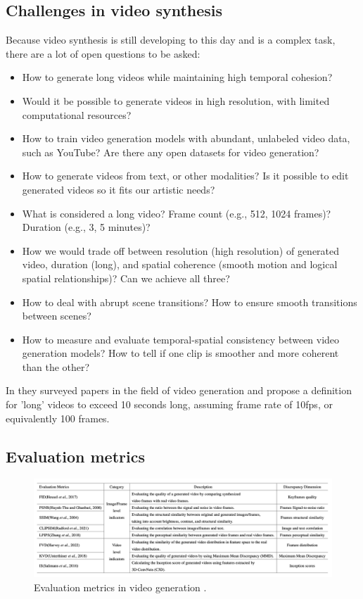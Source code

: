 \subsection*{Challenges in video synthesis}

Because video synthesis is still developing to this day and is a complex task, there are a lot of open questions to be asked:

\begin{itemize}
    \item How to generate long videos while maintaining high temporal cohesion?
    \item Would it be possible to generate videos in high resolution, with limited computational resources?
    \item How to train video generation models with abundant, unlabeled video data, such as YouTube? Are there any open datasets for video generation?
    \item How to generate videos from text, or other modalities? Is it possible to edit generated videos so it fits our artistic needs?
    \item What is considered a long video? Frame count (e.g., 512, 1024 frames)? Duration (e.g., 3, 5 minutes)?
    \item How we would trade off between resolution (high resolution) of generated video, duration (long), and spatial coherence (smooth motion and logical spatial relationships)? Can we achieve all three?
    \item How to deal with abrupt scene transitions? How to ensure smooth transitions between scenes?
    \item How to measure and evaluate temporal-spatial consistency between video generation models? How to tell if one clip is smoother and more coherent than the other?
\end{itemize}

In \cite{long_video_survey} they surveyed papers in the field of video generation and propose a definition for 'long' videos to exceed 10 seconds long, assuming frame rate of 10fps, or equivalently 100 frames.

\subsection{Evaluation metrics}

\begin{figure}
    \centering
    \includegraphics[width=1\textwidth]{images/video_synthesis/eval_metrics.png}
    \caption{Evaluation metrics in video generation \cite{long_video_survey}.}
    \label{fig:video_synthesis_eval_metrics}
\end{figure}

